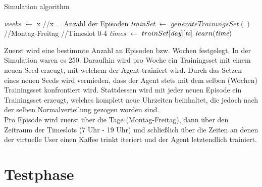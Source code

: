 \begin{algorithm}
    \caption{Simulation algorithm}\label{algo:sim}
    \begin{algorithmic}[1]
    \State \emph{weeks} $\gets$ x   \hfill         //x = Anzahl der Episoden
       \State \emph{trainSet} $\gets$ $generateTrainingsSet()$
           \hfill         //Montag-Freitag
              \hfill         //Timeslot 0-4
       \State \emph{times} $\gets$ $trainSet[\emph{day}][\emph{ts}]$
       \State $learn(\emph{time})$
       \EndFor
                \EndFor
            \EndFor
       \EndFor
    \end{algorithmic}
    \end{algorithm}

Zuerst wird eine bestimmte Anzahl an Episoden bzw. Wochen festgelegt. In der Simulation waren es 250. Daraufhin wird pro Woche ein Trainingsset mit einem neuen Seed erzeugt, mit welchem der Agent trainiert wird. Durch das Setzen eines neuen Seeds wird vermieden, dass der Agent stets mit dem selben (Wochen) Trainingsset konfrontiert wird. Stattdessen wird mit jeder neuen Episode ein Trainingsset erzeugt, welches komplett neue Uhrzeiten beinhaltet, die jedoch nach der selben Normalverteilung gezogen worden sind.\\
Pro Episode wird zuerst über die Tage (Montag-Freitag), dann über den Zeitraum der Timeslots (7 Uhr - 19 Uhr) und schließlich über die Zeiten an denen der virtuelle User einen Kaffee trinkt iteriert und der Agent letztendlich trainiert.\\

\section{Testphase}
\label{sec:testphase}

